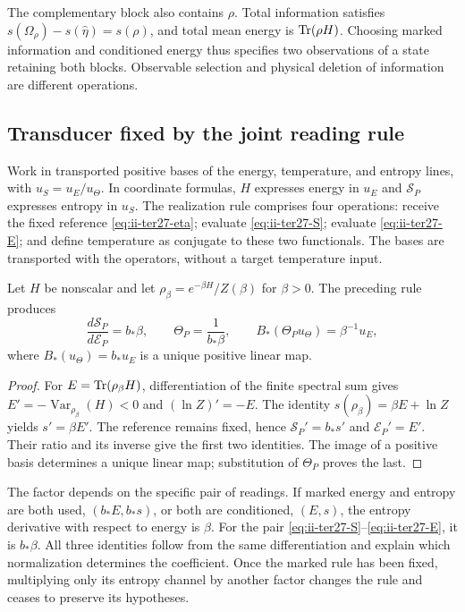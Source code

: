 The complementary block also contains $\rho$. Total information satisfies
$s(\Omega_\rho)-s(\widehat\eta)=s(\rho)$, and total mean energy is
$\operatorname{Tr}(\rho H)$. Choosing marked information and conditioned energy thus
specifies two observations of a state retaining both blocks. Observable
selection and physical deletion of information are different operations.

\subsection{Transducer fixed by the joint reading rule}
\label{subsec:ii-ter27-transducer}

Work in transported positive bases of the energy, temperature, and entropy
lines, with $u_S=u_E/u_\Theta$. In coordinate formulas, $H$ expresses
energy in $u_E$ and $\mathcal S_P$ expresses entropy in $u_S$.
The realization rule comprises four operations: receive the fixed reference
\eqref{eq:ii-ter27-eta}; evaluate \eqref{eq:ii-ter27-S}; evaluate
\eqref{eq:ii-ter27-E}; and define temperature as conjugate to these two
functionals. The bases are transported with the operators, without a
target temperature input.

\begin{theorem}
\label{thm:ii-ter27-transducer}
Let $H$ be nonscalar and let
$\rho_\beta=e^{-\beta H}/Z(\beta)$ for $\beta>0$. The preceding rule
produces
\begin{equation}
 \frac{d\mathcal S_P}{d\mathcal E_P}=b_*\beta,
 \qquad \Theta_P=\frac1{b_*\beta},\qquad
 B_*(\Theta_Pu_\Theta)=\beta^{-1}u_E,
 \label{eq:ii-ter27-transducer}
\end{equation}
where $B_*(u_\Theta)=b_*u_E$ is a unique positive linear map.
\end{theorem}
\begin{proof}
For $E=\operatorname{Tr}(\rho_\beta H)$, differentiation of the finite spectral sum
gives $E'=-\operatorname{Var}_{\rho_\beta}(H)<0$ and
$(\ln Z)'=-E$. The identity $s(\rho_\beta)=\beta E+\ln Z$ yields
$s'=\beta E'$. The reference remains fixed, hence
$\mathcal S_P'=b_*s'$ and $\mathcal E_P'=E'$. Their ratio and its
inverse give the first two identities. The image of a positive basis
determines a unique linear map; substitution of $\Theta_P$ proves the last.
\end{proof}

The factor depends on the specific pair of readings. If marked energy
and entropy are both used, $(b_*E,b_*s)$, or both are conditioned, $(E,s)$,
the entropy derivative with respect to energy is $\beta$. For the pair
\eqref{eq:ii-ter27-S}--\eqref{eq:ii-ter27-E}, it is $b_*\beta$.
All three identities follow from the same differentiation and explain
which normalization determines the coefficient. Once the marked rule
has been fixed, multiplying only its entropy channel by another factor
changes the rule and ceases to preserve its hypotheses.

